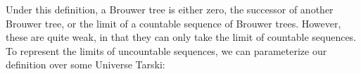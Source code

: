 \label{sec:discussion}

\begin{code}[hide]%
%
\>[2]\AgdaSpace{}%
\AgdaSpace{}%
\AgdaSpace{}%
\AgdaSpace{}%
\AgdaSymbol{(}\AgdaSpace{}%
\AgdaSymbol{;}\AgdaSpace{}%
\AgdaOperator{\AgdaFunction{\AgdaUnderscore{}<\AgdaUnderscore{}}}\AgdaSpace{}%
\AgdaSymbol{;}\AgdaSpace{}%
\AgdaOperator{\AgdaPrimitive{\AgdaUnderscore{}+\AgdaUnderscore{}}}\AgdaSymbol{)}\<%
\\
%
\>[2]\AgdaSpace{}%
\AgdaSpace{}%
\<%
\\
%
\>[2]\AgdaSpace{}%
\AgdaSpace{}%
\<%
\\
%
\>[2]\AgdaSpace{}%
\AgdaSpace{}%
\<%
\\
%
\>[2]\AgdaSpace{}%
\AgdaSpace{}%
\<%
\\
\>[0]\<%
\end{code}

Under this definition, a Brouwer tree is either zero, the successor of another Brouwer tree, or the limit of a countable sequence of Brouwer trees. However, these are quite weak, in that they can only take the limit of countable sequences.
To represent the limits of uncountable sequences, we can parameterize our definition over some Universe \ala Tarski:

\begin{code}%
\>[0][@{}l@{\AgdaIndent{1}}]%
\>[2]\AgdaSpace{}%
\AgdaSpace{}%
\AgdaSymbol{\{}\AgdaSymbol{\}}\<%
\\
\>[2][@{}l@{\AgdaIndent{0}}]%
\>[4]\AgdaSymbol{(}\AgdaSpace{}%
\AgdaSymbol{:}\AgdaSpace{}%
\AgdaSpace{}%
\AgdaSymbol{)}\<%
\\
%
\>[4]\AgdaSymbol{(}\AgdaSpace{}%
\AgdaSymbol{:}\AgdaSpace{}%
\AgdaSpace{}%
\AgdaSpace{}%
\AgdaSpace{}%
\AgdaSymbol{)}\<%
\\
%
\>[4]\AgdaSymbol{(}\AgdaSpace{}%
\AgdaSymbol{:}\AgdaSpace{}%
\AgdaSymbol{)}\AgdaSpace{}%
\AgdaSymbol{(}\AgdaSpace{}%
\AgdaSymbol{:}\AgdaSpace{}%
\AgdaSpace{}%
\AgdaSymbol{(}\AgdaSpace{}%
\AgdaSymbol{)}\AgdaSpace{}%
\AgdaSpace{}%
\AgdaSymbol{)}\AgdaSpace{}%
\<%
\end{code}


